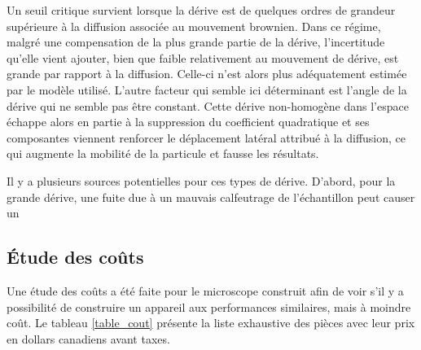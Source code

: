 \documentclass[11pt,letterpaper]{article}
\begin{document}
Un seuil critique survient lorsque la dérive est de quelques ordres de grandeur supérieure à la 
diffusion associée au mouvement brownien. Dans ce régime, malgré une 
compensation de la plus grande partie de la dérive, l'incertitude qu'elle vient ajouter, bien que faible
relativement au mouvement de dérive, est grande par rapport à la diffusion. Celle-ci n'est alors plus 
adéquatement estimée par le modèle utilisé. L'autre facteur qui semble ici déterminant est l'angle de la
dérive qui ne semble pas être constant. Cette dérive non-homogène dans l'espace échappe alors en partie
à la suppression du coefficient quadratique et ses composantes viennent renforcer le déplacement latéral
attribué à la diffusion, ce qui augmente la mobilité de la particule et fausse les résultats. 

Il y a plusieurs sources potentielles pour ces types de dérive. D'abord, pour la grande dérive, une 
fuite due à un mauvais calfeutrage de l'échantillon peut causer un 




\subsection{Étude des coûts}

Une étude des coûts a été faite pour le microscope construit afin de voir s'il y a possibilité
de construire un appareil aux performances similaires, mais à moindre coût. Le tableau \ref{table_cout}
présente la liste exhaustive des pièces avec leur prix en dollars canadiens avant taxes.
\end{document}
